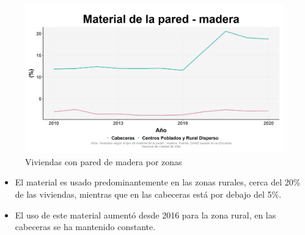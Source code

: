     \begin{figure}[H]
        \caption{Viviendas con pared de madera por zonas \label{map_result_2} }
        \begin{center}
        \includegraphics[width=\textwidth,keepaspectratio]{img/var_161_trend.png}
        \end{center}
    \end{figure}
            \begin{itemize}
                    \item El material es usado predominantemente en las zonas rurales, cerca del 20\% de las viviendas, mientras que en las cabeceras está por debajo del 5\%.
                    \item El uso de este material aumentó desde 2016 para la zona rural, en las cabeceras se ha mantenido constante.
                    \end{itemize}

